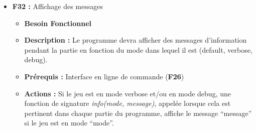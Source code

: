 \documentclass{article}
\begin{document}
\begin{itemize}
\begin{itemize}
\begin{itemize}
            \item \textbf{F39.2 :} Sauvegarder partie dans un fichier (.hexgame)
            \begin{itemize}
                \item \textbf{Actions :} Implémenter les fonctions \textit{save\_game\_as\_file(game, file output)}, \textit{save\_game\_as\_file\_without\_history(game, file)} et \textit{add\_comment(String input)}
                \item \textbf{Tests :} Sauvegarder le jeu puis le load vérifier que les deux structures internes sont identiques, vérifier que si on utilise \textit{save\_game\_as\_file\_without\_history}; on récupère un historique vide, concernant le format si jamais la fonction load renvoie une erreur alors le test renvoie faux.
            \end{itemize}
            \smallskip
            \item \textbf{F39.3 :} Remplacer structures internes, par l’état de jeu spécifié dans un fichier (.hexgame)
            \begin{itemize}
                \item \textbf{Actions :} Implémenter les fonctions \textit{load\_game\_from\_file(file)} (renvoie une erreur si incapable de récupérer une section/ fichier ne correspond pas au format décrit) et \textit{load\_history\_from\_file(file)}
                \item \textbf{Tests :} On sauvegarde puis on charge, dans une structure game, on doit avoir les deux structures identiques et vérifier que l’on  renvoie une erreur si le fichier donné ne correspond pas au bon format.
            \end{itemize}
        \end{itemize}
    \end{itemize}
\bigskip
    \item \textbf{F32 :} Affichage des messages
    \begin{itemize}
        \item \textbf{Besoin Fonctionnel}
        \item \textbf{Description :} Le programme devra afficher des messages d’information pendant la partie en fonction du mode dans lequel il est (default, verbose, debug).
        \item \textbf{Prérequis :} Interface en ligne de commande (\textbf{F26})
        \item \textbf{Actions :} Si le jeu est en mode verbose et/ou en mode debug, une fonction de signature \textit{info(mode, message)}, appelée lorsque cela est pertinent dans chaque partie du programme, affiche le message “message” si le jeu est en mode “mode”.

\end{itemize}
\end{itemize}
\end{document}
